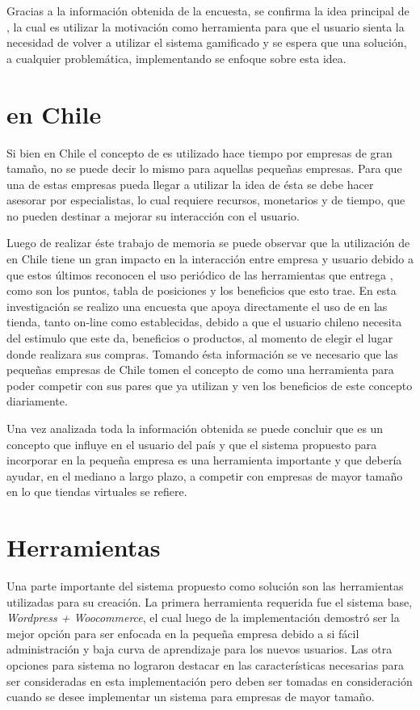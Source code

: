 Gracias a la información obtenida de la encuesta, se confirma la
idea principal de {\gam}, la cual es utilizar la motivación como herramienta para
que el usuario sienta la necesidad de volver a utilizar el sistema gamificado y
se espera que una solución, a cualquier problemática, implementando {\gam} se
enfoque sobre esta idea.

\section{{\GAM} en Chile}

Si bien en Chile el concepto de {\gam} es utilizado hace tiempo por empresas de gran tamaño, no se
puede decir lo mismo para aquellas pequeñas empresas. Para que una de estas empresas pueda
llegar a utilizar la idea de {\gam} ésta se debe hacer asesorar por especialistas, lo cual
requiere recursos, monetarios y de tiempo, que no pueden destinar a mejorar su interacción con el usuario.

Luego de realizar éste trabajo de memoria se puede observar que la utilización de {\gam} en Chile tiene
un gran impacto en la interacción entre empresa y usuario debido a que estos últimos reconocen el uso
periódico de las herramientas que entrega {\gam}, como son los puntos, tabla de posiciones y los
beneficios que esto trae.
En esta investigación se realizo una encuesta que apoya directamente el uso de {\gam} en las tienda, tanto
on-line como establecidas, debido a que el usuario chileno necesita del estimulo que este da, beneficios o productos,
al momento de elegir el lugar donde realizara sus compras. Tomando ésta información se ve necesario que las
pequeñas empresas de Chile tomen el concepto de {\gam} como una herramienta para poder competir con sus
pares que ya utilizan {\gam} y ven los beneficios de este concepto diariamente.

Una vez analizada toda la información obtenida se puede concluir que {\gam} es un concepto que influye
en el usuario del país y que el sistema propuesto para incorporar {\gam} en la pequeña empresa
es una herramienta importante y que debería ayudar, en el mediano a largo plazo, a competir con empresas
de mayor tamaño en lo que tiendas virtuales se refiere.

\section{Herramientas}

Una parte importante del sistema propuesto como solución son las herramientas utilizadas para su creación.
La primera herramienta requerida fue el sistema base, \emph{Wordpress + Woocommerce}, el cual luego de
la implementación demostró ser la mejor opción para ser enfocada en la pequeña empresa debido a si
fácil administración y baja curva de aprendizaje para los nuevos usuarios. Las otra opciones para sistema no lograron
destacar en las características necesarias para ser consideradas en esta implementación pero deben ser
tomadas en consideración cuando se desee implementar un sistema para empresas de mayor tamaño.

